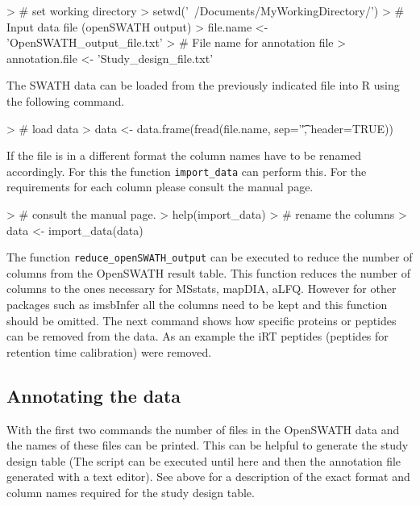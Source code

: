 \documentclass[a4paper]{article}
\begin{document}
\begin{Schunk}
\begin{Sinput}
> # set working directory
> setwd('~/Documents/MyWorkingDirectory/')
> # Input data file (openSWATH output)
> file.name <- 'OpenSWATH_output_file.txt'
> # File name for annotation file
> annotation.file <- 'Study_design_file.txt'
\end{Sinput}
\end{Schunk}

The SWATH data can be loaded from the previously indicated file into R using the following command.

\begin{Schunk}
\begin{Sinput}
> # load data
> data <- data.frame(fread(file.name, sep='\t', header=TRUE))
\end{Sinput}
\end{Schunk}

If the file is in a different format the column names have to be renamed accordingly. For this the function \texttt{import\_data} can perform this. For the requirements for each column please consult the manual page.

\begin{Schunk}
\begin{Sinput}
> # consult the manual page.
> help(import_data)
> # rename the columns
> data <- import_data(data)
\end{Sinput}
\end{Schunk}


The function \texttt{reduce\_openSWATH\_output} can be executed to reduce the number of columns from the OpenSWATH result table. This function reduces the number of columns to the ones necessary for MSstats, mapDIA, aLFQ. However for other packages such as imsbInfer all the columns need to be kept and this function should be omitted.
The next command shows how specific proteins or peptides can be removed from the data. As an example the iRT peptides (peptides for retention time calibration) were removed.

\begin{Schunk}
\end{Schunk}

\subsection{Annotating the data}
With the first two commands the number of files in the OpenSWATH data and the names of these files can be printed. This can be helpful to generate the study design table (The script can be executed until here and then the annotation file generated with a text editor). See above for a description of the exact format and column names required for the study design table.
\end{document}
